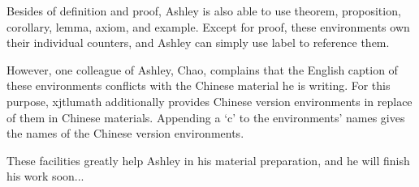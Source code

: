 Besides of definition and proof, Ashley is also able to use theorem, proposition, corollary, lemma, axiom, and example. Except for proof, these environments own their individual counters, and Ashley can simply use label to reference them.

However, one colleague of Ashley, Chao, complains that the English caption of these environments conflicts with the Chinese material he is writing. For this purpose, xjtlumath additionally provides Chinese version environments in replace of them in Chinese materials. Appending a `c' to the environments' names gives the names of the Chinese version environments.

These facilities greatly help Ashley in his material preparation, and he will finish his work soon...